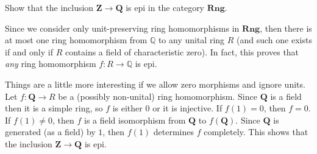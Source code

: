 \begin{exercise}
Show that the inclusion $\mathbf{Z}\to\mathbf{Q}$ is epi in the category $\mathbf{Rng}$.
\end{exercise}
\begin{solution}
Since we consider only unit-preserving ring homomorphisms in $\mathbf{Rng}$, then there is at most one ring homomorphism from $\mathbb{Q}$ to any unital ring $R$ (and such one exists if and only if $R$ contains a field of characteristic zero). In fact, this proves that \emph{any} ring homomorphism $f\colon R\to\mathbb{Q}$ is epi.

Things are a little more interesting if we allow zero morphisms and ignore units. Let $f:\mathbf{Q}\to R$ be a (possibly non-unital) ring homomorphism. Since $\mathbf{Q}$ is a field then it is a simple ring, so $f$ is either $0$ or it is injective. If $f(1)=0$, then $f=0$. If $f(1)\neq 0$, then $f$ is a field isomorphism from $\mathbf{Q}$ to $f(\mathbf{Q})$. Since $\mathbf{Q}$ is generated (as a field) by $1$, then $f(1)$ determines $f$ completely. This shows that the inclusion $\mathbf{Z}\to\mathbf{Q}$ is epi.
\end{solution}


